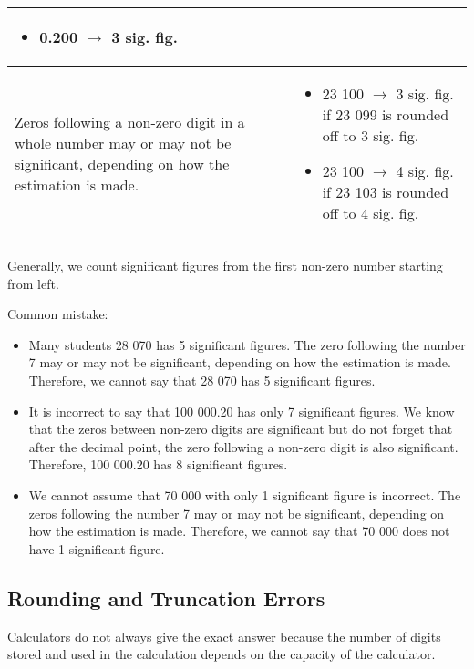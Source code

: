 \documentclass[../main]{subfiles}
\begin{document}
\begin{center}
\begin{tabular}{|p{4cm} | p{4cm} |}
\begin{itemize}
                                                                               \item  0.200 \(\rightarrow\) 3 sig. fig.
                                                                               \end{itemize} \\ \hline
    Zeros following a non-zero digit in a whole number may or may not be significant, depending on how the estimation is made.
    &
      \begin{itemize}
      \item  23 100 \(\rightarrow\) 3 sig. fig. if 23 099 is rounded off to 3 sig. fig.
      \item  23 100 \(\rightarrow\) 4 sig. fig. if 23 103 is rounded off to 4 sig. fig.
      \end{itemize} \\ \hline

  \end{tabular}
\end{center}

Generally, we count significant figures from the first non-zero number starting
from left.

Common mistake:
\begin{itemize}
\item Many students 28 070 has 5 significant figures. The zero following the number 7 may or
  may not be significant, depending on how the estimation is made. Therefore, we
  cannot say that 28 070 has 5 significant figures.
\item It is incorrect to say that 100 000.20 has only 7 significant figures. We
  know that the zeros between non-zero digits are significant but do not forget
  that after the decimal point, the zero following a non-zero digit is also
  significant. Therefore, 100 000.20 has 8 significant figures.
 
\item We cannot assume that 70 000 with only 1 significant figure is incorrect.
  The zeros following the number 7 may or may not be significant, depending on
  how the estimation is made. Therefore, we cannot say that 70 000 does not have
  1 significant figure. 
\end{itemize}

\subsection{Rounding and Truncation Errors}

Calculators do not always give the exact answer because the number of digits
stored and used in the calculation depends on the capacity of the calculator.
\end{document}
